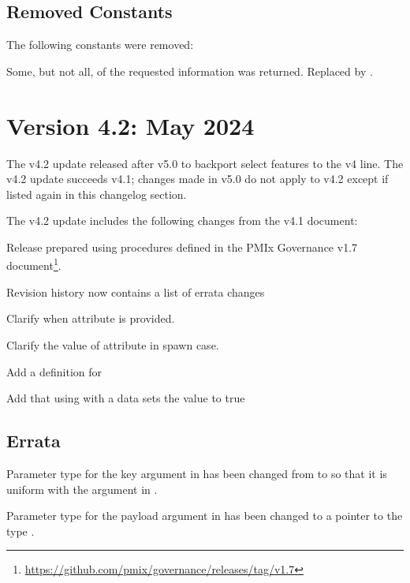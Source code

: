 \subsection{Removed Constants}

The following constants were removed:

\begin{constantdesc}
Some, but not all, of the requested information was returned.
Replaced by .
\end{constantdesc}

\section{Version 4.2: May 2024}

The v4.2 update released after v5.0 to backport select features to the v4 line.
The v4.2 update succeeds v4.1; changes made in v5.0 do not apply to v4.2
except if listed again in this changelog section.

The v4.2 update includes the following changes from the v4.1 document:

\begin{compactitemize}
  \item Release prepared using procedures defined in the PMIx
    Governance v1.7 document\footnote{\url{https://github.com/pmix/governance/releases/tag/v1.7}}.
  \item Revision history now contains a list of errata changes
  \item Clarify when  attribute is provided.
  \item Clarify the value of  attribute in spawn case.
  \item Add a definition for 
  \item Add that using  with a   data sets the value to true
\end{compactitemize}

\subsection{Errata}

\begin{compactitemize}
  \item Parameter type for the key argument in  has been changed from  to  so that it is uniform with the argument in .
  \item Parameter type for the payload argument in  has been changed to a pointer to the type .
\end{compactitemize}

